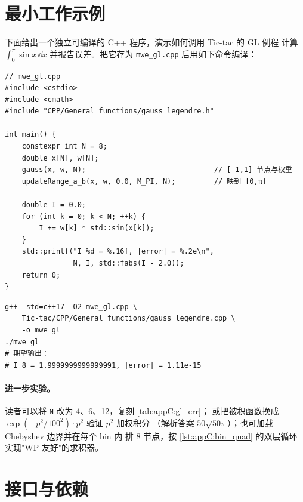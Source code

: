 \section{最小工作示例}
\label{sec:appC:mwe}

下面给出一个独立可编译的 C++ 程序，演示如何调用 Tic-tac 的 GL 例程
计算 $\int_0^{\pi}\sin x\,\dd x$ 并报告误差。把它存为
\texttt{mwe\_gl.cpp} 后用如下命令编译：

\begin{lstlisting}[style=cpp,caption={最小工作示例：GL 求积驱动。}]
// mwe_gl.cpp
#include <cstdio>
#include <cmath>
#include "CPP/General_functions/gauss_legendre.h"

int main() {
    constexpr int N = 8;
    double x[N], w[N];
    gauss(x, w, N);                              // [-1,1] 节点与权重
    updateRange_a_b(x, w, 0.0, M_PI, N);         // 映到 [0,π]

    double I = 0.0;
    for (int k = 0; k < N; ++k) {
        I += w[k] * std::sin(x[k]);
    }
    std::printf("I_%d = %.16f, |error| = %.2e\n",
                N, I, std::fabs(I - 2.0));
    return 0;
}
\end{lstlisting}

\begin{lstlisting}[style=config,caption={编译与运行（独立模式，仅需 \texttt{libm}）。}]
g++ -std=c++17 -O2 mwe_gl.cpp \
    Tic-tac/CPP/General_functions/gauss_legendre.cpp \
    -o mwe_gl
./mwe_gl
# 期望输出：
# I_8 = 1.9999999999999991, |error| = 1.11e-15
\end{lstlisting}

\paragraph{进一步实验。}
读者可以将 \texttt{N} 改为 4、6、12，复刻 \cref{tab:appC:gl_err}；
或把被积函数换成 $\exp(-p^{2}/100^{2})\cdot p^{2}$ 验证 $p^{2}$-加权积分
（解析答案 $50\sqrt{50\pi}$）；也可加载 Chebyshev 边界并在每个 bin 内
排 8 节点，按 \cref{lst:appC:bin_quad} 的双层循环实现"WP 友好"的求积器。

\section{接口与依赖}

